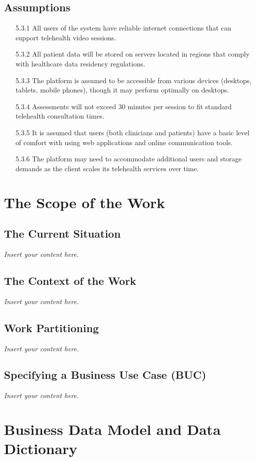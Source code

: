 \documentclass[12pt]{article}
\newcommand{\lips}{\textit{Insert your content here.}}
\begin{document}
\subsection{Assumptions}
\begin{itemize}
  \item[5.3.1] All users of the system have reliable internet connections that can support telehealth video sessions.
  \item[5.3.2] All patient data will be stored on servers located in regions that comply with healthcare data residency regulations.
  \item[5.3.3] The platform is assumed to be accessible from various devices (desktops, tablets, mobile phones), though it may perform optimally on 
  desktops.
  \item[5.3.4] Assessments will not exceed 30 minutes per session to fit standard telehealth consultation times.
  \item[5.3.5] It is assumed that users (both clinicians and patients) have a basic level of comfort with using web applications and online 
  communication tools.
  \item[5.3.6] The platform may need to accommodate additional users and storage demands as the client scales its telehealth services over time.
\end{itemize}

\section{The Scope of the Work}
\subsection{The Current Situation}
\lips
\subsection{The Context of the Work}
\lips
\subsection{Work Partitioning}
\lips
\subsection{Specifying a Business Use Case (BUC)}
\lips

\section{Business Data Model and Data Dictionary}
\end{document}
